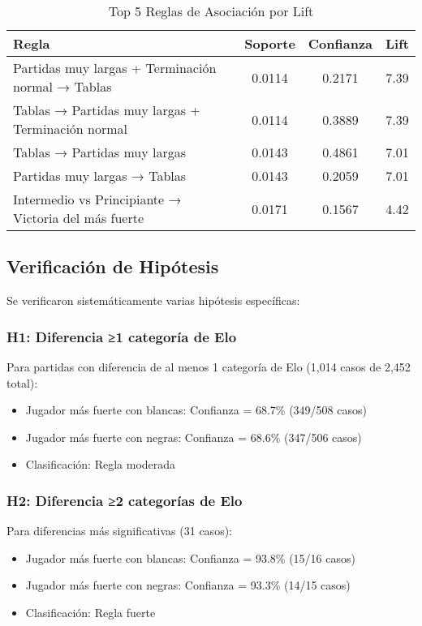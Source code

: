 \documentclass[runningheads]{llncs}
\begin{document}
\begin{table}[h]
\centering
\caption{Top 5 Reglas de Asociación por Lift}
\label{tab:top_rules}
\begin{tabular}{@{}p{6cm}ccc@{}}
\toprule
\textbf{Regla} & \textbf{Soporte} & \textbf{Confianza} & \textbf{Lift} \\
\midrule
Partidas muy largas + Terminación normal → Tablas & 0.0114 & 0.2171 & 7.39 \\
Tablas → Partidas muy largas + Terminación normal & 0.0114 & 0.3889 & 7.39 \\
Tablas → Partidas muy largas & 0.0143 & 0.4861 & 7.01 \\
Partidas muy largas → Tablas & 0.0143 & 0.2059 & 7.01 \\
Intermedio vs Principiante → Victoria del más fuerte & 0.0171 & 0.1567 & 4.42 \\
\bottomrule
\end{tabular}
\end{table}

\subsection{Verificación de Hipótesis}

Se verificaron sistemáticamente varias hipótesis específicas:

\subsubsection{H1: Diferencia ≥1 categoría de Elo}

Para partidas con diferencia de al menos 1 categoría de Elo (1,014 casos de 2,452 total):
\begin{itemize}
\item Jugador más fuerte con blancas: Confianza = 68.7\% (349/508 casos)
\item Jugador más fuerte con negras: Confianza = 68.6\% (347/506 casos)
\item Clasificación: Regla moderada
\end{itemize}

\subsubsection{H2: Diferencia ≥2 categorías de Elo}

Para diferencias más significativas (31 casos):
\begin{itemize}
\item Jugador más fuerte con blancas: Confianza = 93.8\% (15/16 casos)
\item Jugador más fuerte con negras: Confianza = 93.3\% (14/15 casos)
\item Clasificación: Regla fuerte
\end{itemize}
\end{document}
